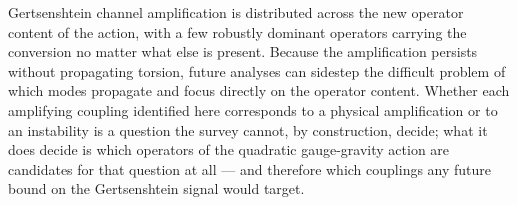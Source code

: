 Gertsenshtein channel amplification is distributed across the new operator
content of the action, with a few robustly
dominant operators carrying the conversion no matter what else is
present. Because the amplification persists without propagating
torsion, future analyses can sidestep the difficult problem of which
modes propagate and focus directly on the operator content.
Whether each amplifying coupling identified here corresponds
to a physical amplification or to an instability is a
question the survey cannot, by construction, decide; what it does
decide is which operators of the quadratic gauge-gravity action are
candidates for that question at all --- and therefore which couplings
any future bound on the Gertsenshtein signal would target.